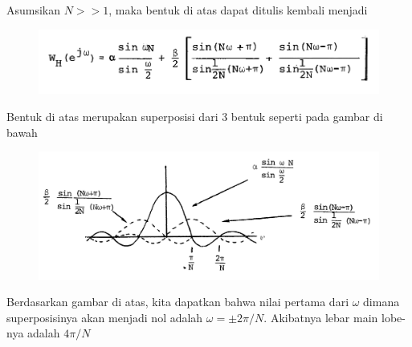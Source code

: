 \documentclass[12pt,a4paper]{article}
\begin{document}
\begin{enumerate}
		Asumsikan $ N >> 1 $, maka bentuk di atas dapat ditulis kembali menjadi
		
		\begin{figure}[H]
			\centering
			\includegraphics[width=0.8\linewidth]{img/img08}
		\end{figure}
		
		Bentuk di atas merupakan superposisi dari 3 bentuk seperti pada gambar di bawah
		
		\begin{figure}[H]
			\centering
			\includegraphics[width=\linewidth]{img/img09}
		\end{figure}
		
		Berdasarkan gambar di atas, kita dapatkan bahwa nilai pertama dari $ \omega $ dimana superposisinya akan menjadi nol adalah $ \omega = \pm 2\pi / N $. Akibatnya lebar main lobe-nya adalah $ 4\pi / N $
	\end{enumerate}
\end{document}
